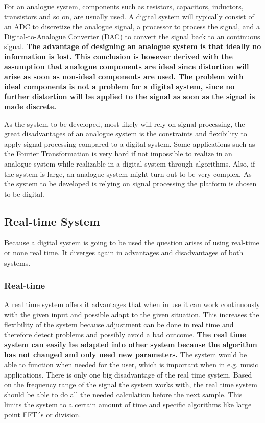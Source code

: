 For an analogue system, components such as resistors, capacitors, inductors, transistors and so on, are usually used. A digital system will typically consist of an ADC to discretize the analogue signal, a processor to process the signal, and a Digital-to-Analogue Converter (DAC) to convert the signal back to an continuous signal. \textbf{The advantage of designing an analogue system is that ideally no information is lost. This conclusion is however derived with the assumption that analogue components are ideal since distortion will arise as soon as non-ideal components are used. The problem with ideal components is not a problem for a digital system, since no further distortion will be applied to the signal as soon as the signal is made discrete.}

As the system to be developed, most likely will rely on signal processing, the great disadvantages of an analogue system is the constraints and flexibility to apply signal processing compared to a digital system. Some applications such as the Fourier Transformation is very hard if not impossible to realize in an analogue system while realizable in a digital system through algorithms. Also, if the system is large, an analogue system might turn out to be very complex.%
As the system to be developed is relying on signal processing the platform is chosen to be digital.

\subsection{Real-time System} \label{sec:RealTime}
Because a digital system is going to be used the question arises of using real-time or none real time. It diverges again in advantages and disadvantages of both systems. %

\subsubsection*{Real-time}
A real time system offers it advantages that when in use it can work continuously with the given input and possible adapt to the given situation. This increases the flexibility of the system because adjustment can be done in real time and therefore detect problems and possibly avoid a bad outcome. \textbf{The real time system can easily be adapted into other system because the algorithm has not changed and only need new parameters.} The system would be able to function when needed for the user, which is important when in e.g. music applications. There is only one big disadvantage of the real time system. Based on the frequency range of the signal the system works with, the real time system should be able to do all the needed calculation before the next sample. This limits the system to a certain amount of time and specific algorithms like large point FFT´s or division. %


